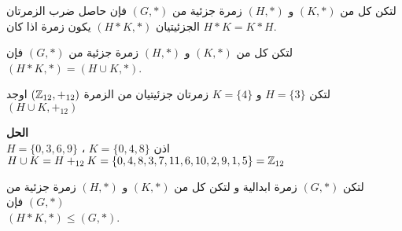  \begin{theorem}
 		لتكن كل من $(K, *)$ و $(H, *)$ زمرة جزئية من $(G, *)$ فإن حاصل ضرب الزمرتان الجزئيتيان $(H*K, *)$ يكون زمرة اذا كان $H*K=K*H$.
 \end{theorem}
 
 \begin{note}
 		لتكن كل من $(K, *)$ و $(H, *)$ زمرة جزئية من $(G, *)$ فإن $(H*K, *) = (H\cup K, *)$.
 \end{note}
 
 \begin{example}
 	لتكن $H=\{3\}$  و $K=\{4\}$ زمرتان جزئيتيان من الزمرة $(\mathbb{Z}_{12}, +_{12})$ اوجد 
 	$(H\cup K, +_{12})$
 \end{example}
 \noindent
 \textbf{الحل}\\
 \noindent
 $H = \{0,3,6,9\}$ ، $K=\{0,4,8\} $ اذن \\
 $H \cup K = H+_{12} K = \{0,4,8,3,7,11,6,10,2,9,1,5\} = \mathbb{Z}_{12}$
 
 
 \begin{theorem}
 	لتكن $(G, *)$ زمرة ابدالية و	لتكن كل من $(K, *)$ و $(H, *)$ زمرة جزئية من $(G, *)$ فإن\\
 	 $(H*K, *) \leq (G, *)$.
 \end{theorem}
 